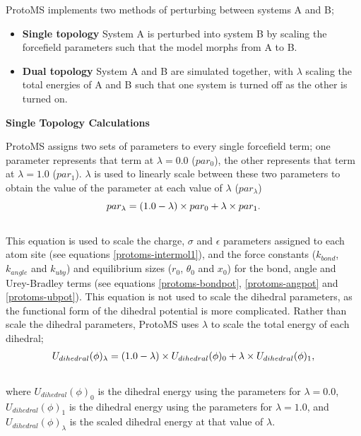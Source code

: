 \documentclass[letterpaper,10pt,english]{manual}
\begin{document}
ProtoMS implements two methods of perturbing between systems A and B;
\begin{itemize}
\item {} 
\textbf{Single topology} System A is perturbed into system B by scaling the forcefield parameters such that the model morphs from A to B.

\item {} 
\textbf{Dual topology} System A and B are simulated together, with $\lambda$ scaling the total energies of A and B such that one system is turned off as the other is turned on.

\end{itemize}
\textbf{Single Topology Calculations}

ProtoMS assigns two sets of parameters to every single forcefield term; one parameter represents that term at $\lambda=0.0$ ($par_0$), the other represents that term at $\lambda=1.0$ ($par_1$). $\lambda$ is used to linearly scale between these two parameters to obtain the value of the parameter at each value of $\lambda$ ($par_\lambda$)
\hypertarget{equation-lambdamix}{}\begin{gather}
\begin{split}par_\lambda = (1.0-\lambda) \times par_0 + \lambda \times par_1.\end{split}\label{protoms-lambdamix}\\\begin{split}\end{split}\notag
\end{gather}
This equation is used to scale the charge, $\sigma$ and $\epsilon$ parameters assigned to each atom site (see equations \eqref{protoms-intermol1}), and the force constants ($k_{bond}$, $k_{angle}$ and $k_{uby}$) and equilibrium sizes ($r_0$, $\theta_0$ and $x_0$) for the bond, angle and Urey-Bradley terms (see equations \eqref{protoms-bondpot}, \eqref{protoms-angpot} and \eqref{protoms-ubpot}). This equation is not used to scale the dihedral parameters, as the functional form of the dihedral potential is more complicated. Rather than scale the dihedral parameters, ProtoMS uses $\lambda$ to scale the total energy of each dihedral;
\hypertarget{equation-dihmix}{}\begin{gather}
\begin{split}U_{dihedral}(\phi)_\lambda = (1.0-\lambda)\times U_{dihedral}(\phi)_0 + \lambda \times U_{dihedral}(\phi)_1,\end{split}\label{protoms-dihmix}\\\begin{split}\end{split}\notag
\end{gather}
where $U_{dihedral}(\phi)_0$ is the dihedral energy using the parameters for $\lambda=0.0$, $U_{dihedral}(\phi)_1$ is the dihedral energy using the parameters for $\lambda=1.0$, and $U_{dihedral}(\phi)_\lambda$ is the scaled dihedral energy at that value of $\lambda$.
\end{document}
